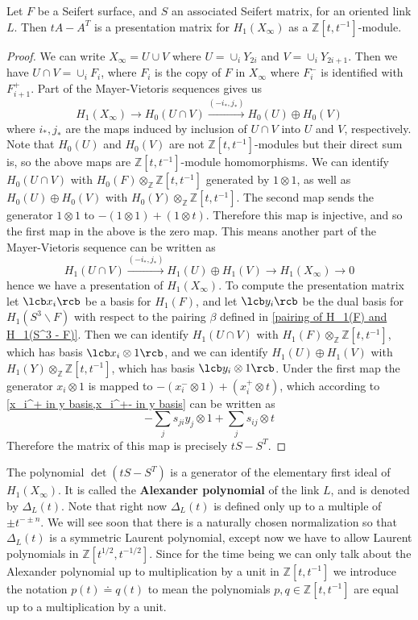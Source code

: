 \begin{thm}
\label{presentation matrix of H_1 of infinite cyclic covering}
Let $F$ be a Seifert surface, and $S$ an associated Seifert matrix, for an oriented link $L$. Then $tA - A^T$ is a presentation matrix for $H_1(X_\infty)$ as a $\mathbb Z[t,t^{-1}]$-module.
\end{thm}
\begin{proof}
We can write $X_\infty = U \cup V$ where $U = \cup_i Y_{2i}$ and $V = \cup_i Y_{2i+1}$. Then we have $U \cap V = \cup_i F_i$, where $F_i$ is the copy of $F$ in $X_\infty$ where $F_i^-$ is identified with $F_{i+1}^+$. Part of the Mayer-Vietoris sequences gives us
\[ H_1(X_\infty) \longrightarrow H_0(U \cap V) \stackrel{(-i_*,j_*)}{\longrightarrow} H_0(U) \oplus H_0(V) \]
where $i_*,j_*$ are the maps induced by inclusion of $U \cap V$ into $U$ and $V$, respectively. Note that $H_0(U)$ and $H_0(V)$ are not $\mathbb Z[t,t^{-1}]$-modules but their direct sum is, so the above maps are $\mathbb Z[t,t^{-1}]$-module homomorphisms. We can identify $H_0(U \cap V)$ with $H_0(F) \otimes_{\mathbb Z} \mathbb Z[t,t^{-1}]$ generated by $1 \otimes 1$, as well as $H_0(U) \oplus H_0(V)$ with $H_0(Y) \otimes_{\mathbb Z} \mathbb Z[t,t^{-1}]$. The second map sends the generator $1 \otimes 1$ to $-(1 \otimes 1) + (1 \otimes t)$. Therefore this map is injective, and so the first map in the above is the zero map. This means another part of the Mayer-Vietoris sequence can be written as
\[ H_1(U \cap V) \stackrel{(-i_*,j_*)}{\longrightarrow} H_1(U) \oplus H_1(V) \longrightarrow H_1(X_\infty) \longrightarrow 0 \]
hence we have a presentation of $H_1(X_\infty)$. To compute the presentation matrix let $\lcb x_i \rcb$ be a basis for $H_1(F)$, and let $\lcb y_i \rcb$ be the dual basis for $H_1(S^3 \backslash F)$ with respect to the pairing $\beta$ defined in \cref{pairing of H_1(F) and H_1(S^3 - F)}. Then we can identify $H_1(U \cap V)$ with $H_1(F) \otimes_{\mathbb Z} \mathbb Z[t,t^{-1}]$, which has basis $\lcb x_i \otimes 1 \rcb$, and we can identify $H_1(U) \oplus H_1(V)$ with $H_1(Y) \otimes_{\mathbb Z} \mathbb Z[t,t^{-1}]$, which has basis $\lcb y_i \otimes 1 \rcb$. Under the first map the generator $x_i \otimes 1$ is mapped to $-(x_i^- \otimes 1) + (x_i^+ \otimes t)$, which according to \cref{x_i^+ in y basis,x_i^+- in y basis} can be written as
\[ -\sum_j s_{ji} y_j \otimes 1 + \sum_j s_{ij} \otimes t \]
Therefore the matrix of this map is precisely $tS - S^T$.
\end{proof}

The polynomial $\det(tS-S^T)$ is a generator of the elementary first ideal of $H_1(X_\infty)$. It is called the \textbf{Alexander polynomial} of the link $L$, and is denoted by $\Delta_L(t)$. Note that right now $\Delta_L(t)$ is defined only up to a multiple of $\pm t^{-\pm n}$. We will see soon that there is a naturally chosen normalization so that $\Delta_L(t)$ is a symmetric Laurent polynomial, except now we have to allow Laurent polynomials in $\mathbb Z[t^{1/2},t^{-1/2}]$. Since for the time being we can only talk about the Alexander polynomial up to multiplication by a unit in $\mathbb Z[t,t^{-1}]$ we introduce the notation $p(t) \dotequal q(t)$ to mean the polynomials $p,q \in \mathbb Z[t,t^{-1}]$ are equal up to a multiplication by a unit. 

